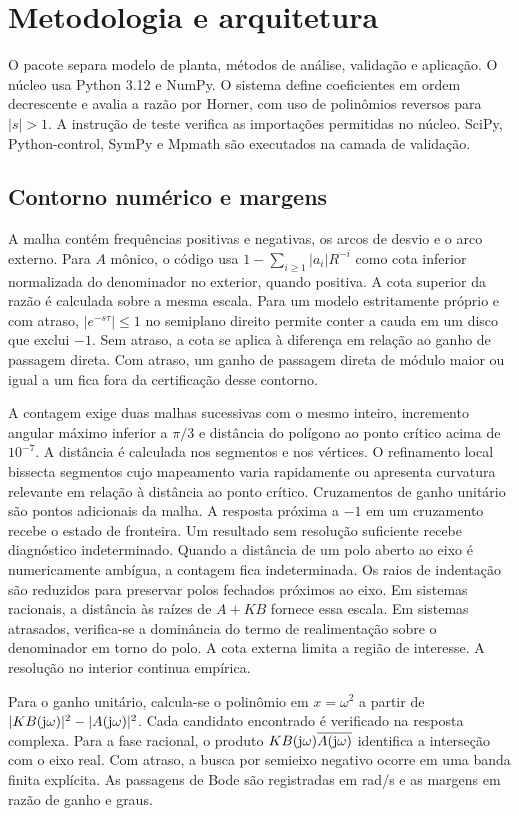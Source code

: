 \section{Metodologia e arquitetura}
O pacote separa modelo de planta, métodos de análise, validação e
aplicação. O núcleo usa Python 3.12 e NumPy. O sistema define
coeficientes em ordem decrescente e avalia a razão por Horner, com
uso de polinômios reversos para $|s|>1$. A instrução de teste verifica
as importações permitidas no núcleo. SciPy, Python-control, SymPy e
Mpmath são executados na camada de validação.

\subsection{Contorno numérico e margens}
A malha contém frequências positivas e negativas, os arcos de desvio
e o arco externo. Para $A$ mônico, o código usa
$1-\sum_{i\ge1}|a_i|R^{-i}$ como cota inferior normalizada do
denominador no exterior, quando positiva. A cota superior da razão
é calculada sobre a mesma escala. Para um modelo estritamente
próprio e com atraso, $|e^{-s\tau}|\le1$ no semiplano direito permite
conter a cauda em um disco que exclui $-1$. Sem atraso, a cota se
aplica à diferença em relação ao ganho de passagem direta. Com atraso,
um ganho de passagem direta de módulo maior ou igual a um fica fora
da certificação desse contorno.

A contagem exige duas malhas sucessivas com o mesmo inteiro,
incremento angular máximo inferior a $\pi/3$ e distância do polígono
ao ponto crítico acima de $10^{-7}$. A distância é calculada nos
segmentos e nos vértices. O refinamento local bissecta segmentos cujo
mapeamento varia rapidamente ou apresenta curvatura relevante em relação
à distância ao ponto crítico. Cruzamentos de ganho unitário são pontos
adicionais da malha. A resposta próxima a $-1$ em um cruzamento
recebe o estado de fronteira. Um resultado sem resolução suficiente
recebe diagnóstico indeterminado. Quando a distância de um polo aberto ao eixo é numericamente
ambígua, a contagem fica indeterminada. Os raios de indentação
são reduzidos para preservar polos fechados próximos ao eixo.
Em sistemas racionais, a distância às raízes de $A+KB$ fornece
essa escala. Em sistemas atrasados, verifica-se a dominância do
termo de realimentação sobre o denominador em torno do polo.
A cota externa limita a região de interesse. A resolução no
interior continua empírica.

Para o ganho unitário, calcula-se o polinômio em $x=\omega^2$
a partir de $|KB(\mathrm{j}\omega)|^2-|A(\mathrm{j}\omega)|^2$. Cada candidato
encontrado é verificado na resposta complexa. Para a fase racional,
o produto $KB(\mathrm{j}\omega)\overline{A(\mathrm{j}\omega)}$ identifica a
interseção com o eixo real. Com atraso, a busca por semieixo negativo
ocorre em uma banda finita explícita. As passagens de Bode são
registradas em rad/s e as margens em razão de ganho e graus.

